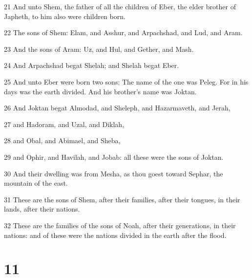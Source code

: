 \par 21 And unto Shem, the father of all the children of Eber, the elder brother of Japheth, to him also were children born.
\par 22 The sons of Shem: Elam, and Asshur, and Arpachshad, and Lud, and Aram.
\par 23 And the sons of Aram: Uz, and Hul, and Gether, and Mash.
\par 24 And Arpachshad begat Shelah; and Shelah begat Eber.
\par 25 And unto Eber were born two sons: The name of the one was Peleg. For in his days was the earth divided. And his brother's name was Joktan.
\par 26 And Joktan begat Almodad, and Sheleph, and Hazarmaveth, and Jerah,
\par 27 and Hadoram, and Uzal, and Diklah,
\par 28 and Obal, and Abimael, and Sheba,
\par 29 and Ophir, and Havilah, and Jobab: all these were the sons of Joktan.
\par 30 And their dwelling was from Mesha, as thou goest toward Sephar, the mountain of the east.
\par 31 These are the sons of Shem, after their families, after their tongues, in their lands, after their nations.
\par 32 These are the families of the sons of Noah, after their generations, in their nations: and of these were the nations divided in the earth after the flood.

\chapter{11}

